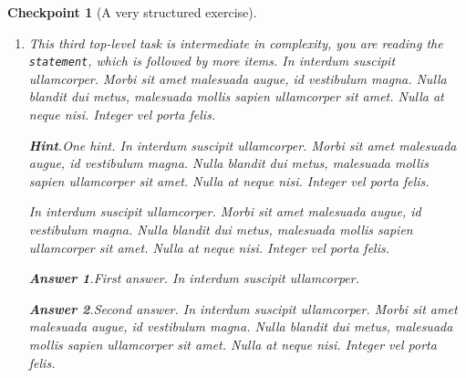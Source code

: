 \documentclass[pdflatex]{sn-jnl}
\theoremstyle{thmstyleone}%
\theoremstyle{thmstyletwo}%
\newtheorem{inlineexercise}[theorem]{Checkpoint}
\theoremstyle{thmstylethree}%
\newcommand{\blocktitlefont}{\relax}
\newcommand{\mono}[1]{\texttt{#1}}
\numberwithin{equation}{section}
\begin{document}
\begin{inlineexercise}[A very structured exercise]
\begin{enumerate}[font=\bfseries,label=(\alph*),ref=\alph*]
\begin{enumerate}[font=\bfseries,label=(\roman*),ref=\theenumi.\roman*]
\begin{enumerate}[font=\bfseries,label=(\Alph*),ref=\theenumi.\theenumii.\Alph*]
\par
In interdum suscipit ullamcorper%
\par
In interdum suscipit ullamcorper. Morbi sit amet malesuada augue, id vestibulum magna. Nulla blandit dui metus, malesuada mollis sapien ullamcorper sit amet. Nulla at neque nisi. Integer vel porta felis.%
\end{enumerate}%
The conclusion of the structured subtask.  In interdum suscipit ullamcorper. Morbi sit amet malesuada augue, id vestibulum magna. Nulla blandit dui metus, malesuada mollis sapien ullamcorper sit amet. Nulla at neque nisi. Integer vel porta felis.%
\item{}A simple task as the last subtask.  In interdum suscipit ullamcorper. Morbi sit amet malesuada augue, id vestibulum magna. Nulla blandit dui metus, malesuada mollis sapien ullamcorper sit amet. Nulla at neque nisi. Integer vel porta felis.%
\end{enumerate}%
This concludes our structured second task.  In interdum suscipit ullamcorper. Morbi sit amet malesuada augue, id vestibulum magna. Nulla blandit dui metus, malesuada mollis sapien ullamcorper sit amet. Nulla at neque nisi. Integer vel porta felis.%
\item{}This third top-level task is intermediate in complexity, you are reading the \mono{statement}, which is followed by more items. In interdum suscipit ullamcorper. Morbi sit amet malesuada augue, id vestibulum magna. Nulla blandit dui metus, malesuada mollis sapien ullamcorper sit amet. Nulla at neque nisi. Integer vel porta felis.%
\par\smallskip%
\noindent\textbf{\blocktitlefont Hint}.\hypertarget{exercise-structured-6-2}{}\quad{}One hint.  In interdum suscipit ullamcorper. Morbi sit amet malesuada augue, id vestibulum magna. Nulla blandit dui metus, malesuada mollis sapien ullamcorper sit amet. Nulla at neque nisi. Integer vel porta felis.%
\par
In interdum suscipit ullamcorper. Morbi sit amet malesuada augue, id vestibulum magna. Nulla blandit dui metus, malesuada mollis sapien ullamcorper sit amet. Nulla at neque nisi. Integer vel porta felis.%
\par\smallskip%
\noindent\textbf{\blocktitlefont Answer 1}.\hypertarget{exercise-structured-6-3}{}\quad{}First answer.  In interdum suscipit ullamcorper.%
\par\smallskip%
\noindent\textbf{\blocktitlefont Answer 2}.\hypertarget{exercise-structured-6-4}{}\quad{}Second answer.  In interdum suscipit ullamcorper. Morbi sit amet malesuada augue, id vestibulum magna. Nulla blandit dui metus, malesuada mollis sapien ullamcorper sit amet. Nulla at neque nisi. Integer vel porta felis.%

\end{enumerate}
\end{inlineexercise}
\end{document}
